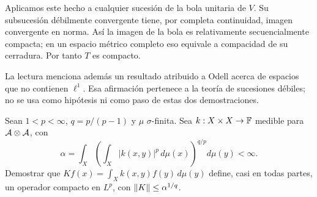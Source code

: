 \begin{solucion}
Aplicamos este hecho a cualquier sucesión de la bola unitaria de $V$. Su subsucesión débilmente convergente tiene, por completa continuidad, imagen convergente en norma. Así la imagen de la bola es relativamente secuencialmente compacta; en un espacio métrico completo eso equivale a compacidad de su cerradura. Por tanto $T$ es compacto.

La lectura menciona además un resultado atribuido a Odell acerca de espacios que no contienen $\ell^1$. Esa afirmación pertenece a la teoría de sucesiones débiles; no se usa como hipótesis ni como paso de estas dos demostraciones.
\end{solucion}

\begin{ejercicio}\label{ej:v2-l21-6}
Sean $1<p<\infty$, $q=p/(p-1)$ y $\mu$ $\sigma$-finita. Sea $k:X\times X\to\mathbb F$ medible para $\mathcal A\otimes\mathcal A$, con
\[
 \alpha=\int_X\left(\int_X|k(x,y)|^p\,d\mu(x)\right)^{q/p}d\mu(y)<\infty.
\]
Demostrar que $Kf(x)=\int_Xk(x,y)f(y)\,d\mu(y)$ define, casi en todas partes, un operador compacto en $L^p$, con $\left\lVert K\right\rVert\le\alpha^{1/q}$.
\end{ejercicio}
